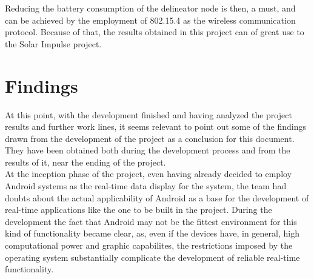 \begin{itemize}
				Reducing the battery consumption of the delineator node is then, a must, and can be achieved by
				the employment of 802.15.4 as the wireless communication protocol. Because of that, the results
				obtained in this project can of great use to the Solar Impulse project.\\
	
		\end{itemize}
	
	\section{Findings}
	\label{sec:end-findings}

		At this point, with the development finished and having analyzed the project results and further work lines, it seems relevant to point out some of the findings drawn from the development of the project as a conclusion for this document. They have been obtained both during the development process and from the results of it, near the ending of the project.\\
		
		At the inception phase of the project, even having already decided to employ Android systems as the real-time data display for the system, the team had doubts about the actual applicability of Android as a base for the development of real-time applications like the one to be built in the project. During the development the fact that Android may not be the fittest environment for this kind of functionality became clear, as, even if the devices have, in general, high computational power and graphic capabilites, the restrictions imposed by the operating system substantially complicate the development of reliable real-time functionality.\\

